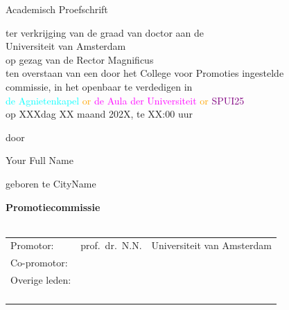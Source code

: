 {%
\clearpage
\par\vskip 2cm
\begin{center}
\printtitle
\par\vspace {4cm}
{\large \sc Academisch Proefschrift}
\par\vspace {1cm}
{\large ter verkrijging van de graad van doctor aan de \\
Universiteit van Amsterdam\\
op gezag van de Rector Magnificus\\
ten overstaan van een door het College voor Promoties ingestelde \\
commissie, in het openbaar te verdedigen in \\
\textcolor{cyan}{de Agnietenkapel} \textcolor{orange}{or} \textcolor{magenta}{de Aula der Universiteit}
\textcolor{orange}{or} \textcolor{purple}{SPUI25}\\
op XXXdag XX maand 202X, te XX:00 uur \\ } %
\par\vspace {1cm} {\large door}
\par \vspace {1cm}
{\Large Your Full Name}
\par\vspace {1cm}
{\large geboren te CityName} 
\end{center}


\clearpage
\noindent%
\textbf{Promotiecommissie} \\\\
\begin{tabular}{@{}l l l}
Promotor: 
& prof.\ dr.\ N.N. & Universiteit van Amsterdam %
\\
Co-promotor: 
& \todo{?} & \todo{?} 
\\[1.2ex]
Overige leden: 
& \todo{?} & \todo{?} \\
& \todo{?} & \todo{?} \\
& \todo{?} & \todo{?} \\
& \todo{?} & \todo{?} \\
& \todo{?} & \todo{?} \\
\end{tabular}

}
